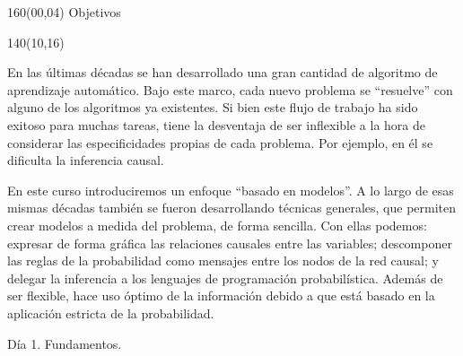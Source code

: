 \documentclass[shownotes,aspectratio=169]{beamer}
\begin{document}
\begin{frame}

\begin{textblock}{160}(00,04)\centering
\textcolor{black!85}{\Large Objetivos}
\end{textblock}

\begin{textblock}{140}(10,16)

\normalsize

\parbox{14cm}{En las últimas décadas se han desarrollado una gran cantidad de algoritmo de aprendizaje automático.
Bajo este marco, cada nuevo problema se ``resuelve'' con alguno de los algoritmos ya existentes.
Si bien este flujo de trabajo ha sido exitoso para muchas tareas, tiene la desventaja de ser inflexible a la hora de considerar las especificidades propias de cada problema.
Por ejemplo, en él se dificulta la inferencia causal.

\vspace{0.3cm}

En este curso introduciremos un enfoque ``basado en modelos''.
A lo largo de esas mismas décadas también se fueron desarrollando técnicas generales, que permiten crear modelos a medida del problema, de forma sencilla.
Con ellas podemos: expresar de forma gráfica las relaciones causales entre las variables; descomponer las reglas de la probabilidad como mensajes entre los nodos de la red causal; y delegar la inferencia a los lenguajes de programación probabilística.
Además de ser flexible, hace uso óptimo de la información debido a que está basado en la aplicación estricta de la probabilidad.
}
\end{textblock}
\end{frame}


\begin{frame}

\centering \LARGE
Día 1. Fundamentos.

\end{frame}
\end{document}
